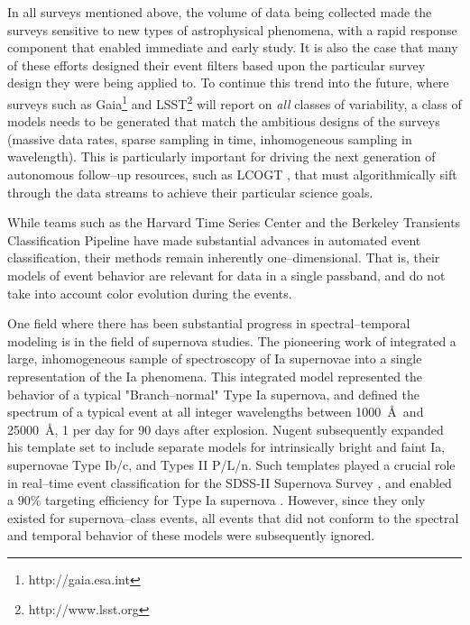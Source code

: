 


In all surveys mentioned above, the volume of data being collected made the
surveys sensitive to new types of astrophysical phenomena, with a rapid response
component that enabled immediate and early study.  It is also the case that many
of these efforts designed their event filters based upon the particular survey
design they were being applied to.  To continue this trend into the future,
where surveys such as Gaia\footnote{http://gaia.esa.int} and
LSST\footnote{http://www.lsst.org} will report on {\it all} classes of
variability, a class of models needs to be generated that match the ambitious
designs of the surveys (massive data rates, sparse sampling in time,
inhomogeneous sampling in wavelength).  This is particularly important for
driving the next generation of autonomous follow--up resources, such as LCOGT
\citep{2008AN....329..269H}, that must algorithmically sift through the data
streams to achieve their particular science goals.

 \smallskip

While teams such as the Harvard Time Series Center \citep{} and the Berkeley
Transients Classification Pipeline \citep{} have made substantial advances in
automated event classification, their methods remain inherently
one--dimensional. That is, their models of event behavior are relevant for data
in a single passband, and do not take into account color evolution during the
events.

One field where there has been substantial progress in spectral--temporal
modeling is in the field of supernova studies. The pioneering work of
\cite{2002PASP..114..803N} integrated a large, inhomogeneous sample of
spectroscopy of Ia supernovae into a single representation of the Ia phenomena.
This integrated model represented the behavior of a typical "Branch--normal"
Type Ia supernova, and defined the spectrum of a typical event at all integer
wavelengths between 1000~\AA~and 25000~\AA, 1 per day for 90 days after
explosion.  Nugent subsequently expanded his template set to include separate
models for intrinsically bright and faint Ia, supernovae Type Ib/c, and Types II
P/L/n. Such templates played a crucial role in real--time event classification
for the SDSS-II Supernova Survey \citep{2008AJ....135..338F}, and enabled a
$90\%$ targeting efficiency for Type Ia supernova \citep{2008AJ....135..348S}.
However, since they only existed for supernova--class events, all events that
did not conform to the spectral and temporal behavior of these models were
subsequently ignored.


